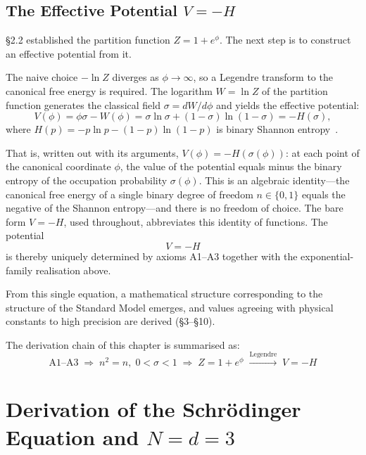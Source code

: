 \documentclass[12pt,a4paper]{article}
\begin{document}
\subsection{The Effective Potential \texorpdfstring{$V = -H$}{V = -H}}

\S2.2 established the partition function $Z = 1+e^\phi$.
The next step is to construct an effective potential from it.

The naive choice $-\ln Z$ diverges as
$\phi \to \infty$, so a Legendre transform to the canonical
free energy is required.
The logarithm $W = \ln Z$ of the partition function
generates the classical field
$\sigma = dW/d\phi$ and yields the effective potential:
\begin{equation}\label{eq:legendre}
  V(\phi) = \phi\sigma - W(\phi)
  = \sigma\ln\sigma + (1{-}\sigma)\ln(1{-}\sigma) = -H(\sigma),
\end{equation}
where $H(p) = -p\ln p - (1{-}p)\ln(1{-}p)$
is binary Shannon entropy~\cite{shannon}.

That is, written out with its arguments, $V(\phi) = -H(\sigma(\phi))$: at each point of the canonical coordinate $\phi$, the value of the potential equals minus the binary entropy of the occupation probability $\sigma(\phi)$. This is an algebraic identity---the canonical free energy of a single binary degree of freedom $n \in \{0,1\}$ equals the negative of the Shannon entropy---and there is no freedom of choice. The bare form $V = -H$, used throughout, abbreviates this identity of functions.
The potential
\begin{equation}\label{eq:VH}
  V = -H
\end{equation}
is thereby uniquely determined by axioms A1--A3 together with the
exponential-family realisation above.

From this single equation, a mathematical structure corresponding to
the structure of the Standard Model emerges, and values agreeing with physical
constants to high precision are derived (\S3--\S10).

The derivation chain of this chapter is summarised as:
\[
  \text{A1--A3}\;\Rightarrow\; n^2{=}n,\; 0<\sigma<1
  \;\Rightarrow\; Z = 1{+}e^{\phi}
  \;\xrightarrow{\text{Legendre}}\; V = -H
\]


\section{Derivation of the Schr\"odinger Equation and \texorpdfstring{$N = d = 3$}{N = d = 3}}\label{sec:theorem}
\end{document}
